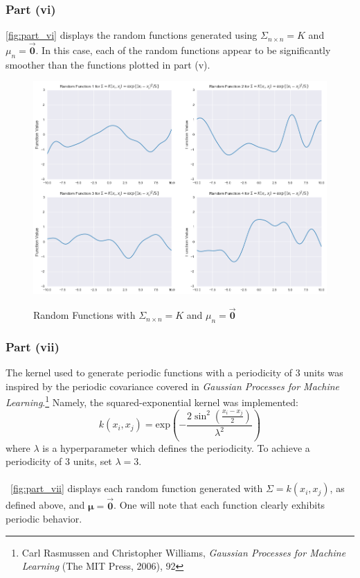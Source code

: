 \documentclass[twoside,11pt]{homework}
\DeclarePairedDelimiter{\2norm}{\lVert}{\rVert^2_2}
\newcommand{\1}[1]{\mathds{1}\left[#1\right]}
\begin{document}
\subsubsection*{Part (vi)}

\autoref{fig:part_vi} displays the random functions generated using $\Sigma_{n \times n} = K$ and $\mu_{n} = \bm{\vec{0}}$. In this case, each of the random functions appear to be significantly smoother than the functions plotted in part (v).

\begin{figure}[H]
\centering
\caption{Random Functions with $\Sigma_{n \times n} = K$ and $\mu_{n} = \bm{\vec{0}}$}
\includegraphics[scale=0.4]{"../code/figures/part_vi_kernel"}
\label{fig:part_vi}
\end{figure}


\vspace{0.15in}

\subsubsection*{Part (vii)}

The kernel used to generate periodic functions with a periodicity of 3 units was inspired by the periodic covariance covered in \textit{Gaussian Processes for Machine Learning}.\footnote{Carl Rasmussen and Christopher Williams, \textit{Gaussian Processes for Machine Learning} (The MIT Press, 2006), 92} Namely, the squared-exponential kernel was implemented: $$k(x_i, x_j) = \text{exp}\left(-\frac{2\sin^2\left(\frac{x_i-x_j}{2}\right)}{\lambda^2}\right)$$ where $\lambda$ is a hyperparameter which defines the periodicity. To achieve a periodicity of 3 units,  set $\lambda = 3$. \\\ \\\
\autoref{fig:part_vii} displays each random function generated with $\Sigma = k(x_i, x_j)$, as defined above, and $\bm{\mu} = \bm{\vec{0}}$.  One will note that each function clearly exhibits periodic behavior.
\end{document}
